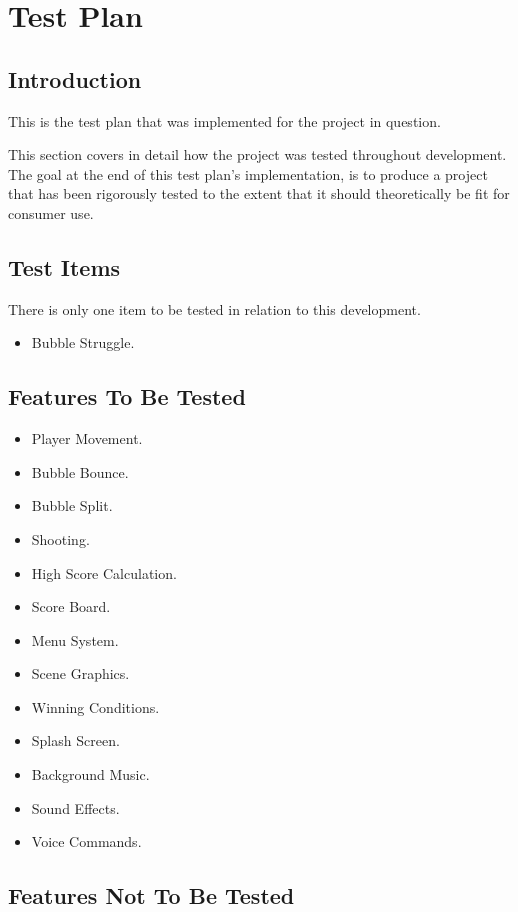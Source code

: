 \documentclass{article}
\begin{document}
\section{Test Plan}


\subsection{Introduction}
This is the test plan that was implemented for the project in question.
\bigskip

This section covers in detail how the project was tested throughout development.
The goal at the end of this test plan's implementation, is to produce a project that has been rigorously tested to the extent that it should theoretically be fit for consumer use. 

\subsection{Test Items}
There is only one item to be tested in relation to this development.

\begin{itemize}
  \item Bubble Struggle.
\end{itemize}

\subsection{Features To Be Tested}

\begin{itemize}
  \item Player Movement.
  \item Bubble Bounce.
  \item Bubble Split.
  \item Shooting.
  \item High Score Calculation.
  \item Score Board.
  \item Menu System.
  \item Scene Graphics.
  \item Winning Conditions.
  \item Splash Screen.
  \item Background Music.
  \item Sound Effects.
  \item Voice Commands.
\end{itemize}

\subsection{Features Not To Be Tested}
\end{document}
